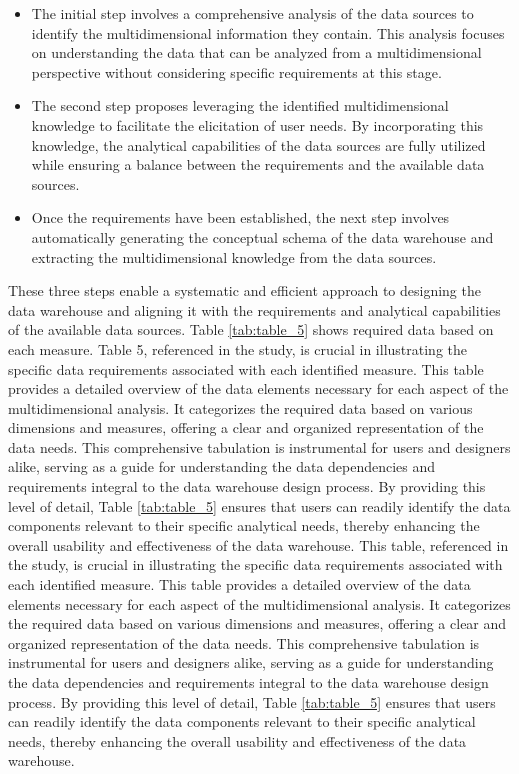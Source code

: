 \documentclass[
11pt, %
oneside, %
english, %
singlespacing, %
]{macthesis} %
\begin{document}
\begin{itemize}
\item
  The initial step involves a comprehensive analysis of the data sources to identify the multidimensional information they contain. This analysis focuses on understanding the data that can be analyzed from a multidimensional perspective without considering specific requirements at this stage.
\item
  The second step proposes leveraging the identified multidimensional knowledge to facilitate the elicitation of user needs. By incorporating this knowledge, the analytical capabilities of the data sources are fully utilized while ensuring a balance between the requirements and the available data sources.
\item
  Once the requirements have been established, the next step involves automatically generating the conceptual schema of the data warehouse and extracting the multidimensional knowledge from the data sources.
\end{itemize}

These three steps enable a systematic and efficient approach to designing the data warehouse and aligning it with the requirements and analytical capabilities of the available data sources. Table \ref{tab:table_5} shows required data based on each measure. Table 5, referenced in the study, is crucial in illustrating the specific data requirements associated with each identified measure. This table provides a detailed overview of the data elements necessary for each aspect of the multidimensional analysis. It categorizes the required data based on various dimensions and measures, offering a clear and organized representation of the data needs. This comprehensive tabulation is instrumental for users and designers alike, serving as a guide for understanding the data dependencies and requirements integral to the data warehouse design process. By providing this level of detail, Table \ref{tab:table_5} ensures that users can readily identify the data components relevant to their specific analytical needs, thereby enhancing the overall usability and effectiveness of the data warehouse. This table, referenced in the study, is crucial in illustrating the specific data requirements associated with each identified measure. This table provides a detailed overview of the data elements necessary for each aspect of the multidimensional analysis. It categorizes the required data based on various dimensions and measures, offering a clear and organized representation of the data needs. This comprehensive tabulation is instrumental for users and designers alike, serving as a guide for understanding the data dependencies and requirements integral to the data warehouse design process. By providing this level of detail, Table \ref{tab:table_5} ensures that users can readily identify the data components relevant to their specific analytical needs, thereby enhancing the overall usability and effectiveness of the data warehouse.
\end{document}
